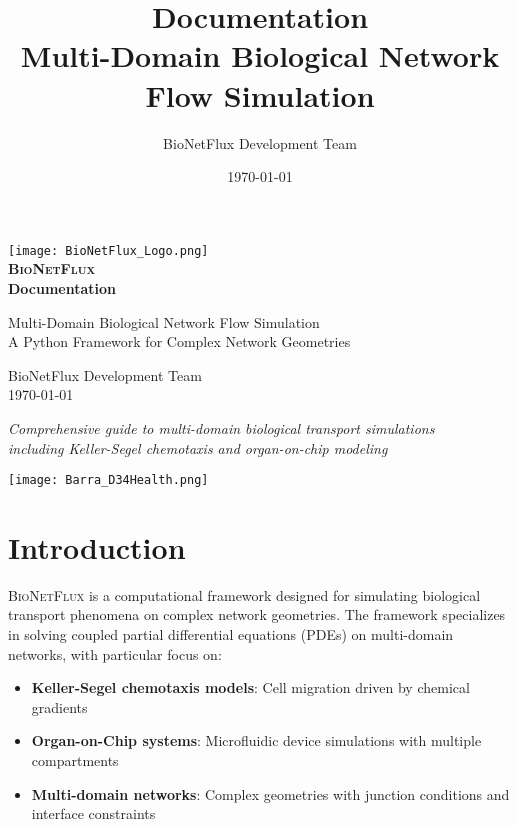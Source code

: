 \documentclass[11pt,a4paper]{article}
\title{\Huge {\textbf{\bionetflux{} Documentation}} \\[0.5cm]
       \Large Multi-Domain Biological Network Flow Simulation}
\author{BioNetFlux Development Team}
\date{\today}
\newcommand{\bionetflux}{\textsc{BioNetFlux}}
\begin{document}
\begin{titlepage}
    \centering
    
    \texttt{[image: BioNetFlux\_Logo.png]}\\[1cm]
    
    {\Huge \textbf{\bionetflux{}} \\[0.5cm]}
    {\Large \textbf{Documentation} \\[1cm]}
    
    {\large Multi-Domain Biological Network Flow Simulation \\[0.5cm]}
    {\large A Python Framework for Complex Network Geometries \\[2cm]}

    
    {\Large BioNetFlux Development Team \\[0.5cm]}
    {\large \today}
    
    \vfill
    
    {\footnotesize 
    \textit{Comprehensive guide to multi-domain biological transport simulations} \\
    \textit{including Keller-Segel chemotaxis and organ-on-chip modeling}
    }
        
        \vskip3cm
        
    \texttt{[image: Barra\_D34Health.png]}\\[2cm]
\end{titlepage}

\tableofcontents
\clearpage

\section{Introduction}

\bionetflux{} is a computational framework designed for simulating biological transport phenomena on complex network geometries. The framework specializes in solving coupled partial differential equations (PDEs) on multi-domain networks, with particular focus on:

\begin{itemize}
    \item \textbf{Keller-Segel chemotaxis models}: Cell migration driven by chemical gradients
    \item \textbf{Organ-on-Chip systems}: Microfluidic device simulations with multiple compartments
    \item \textbf{Multi-domain networks}: Complex geometries with junction conditions and interface constraints
\end{itemize}
\end{document}
